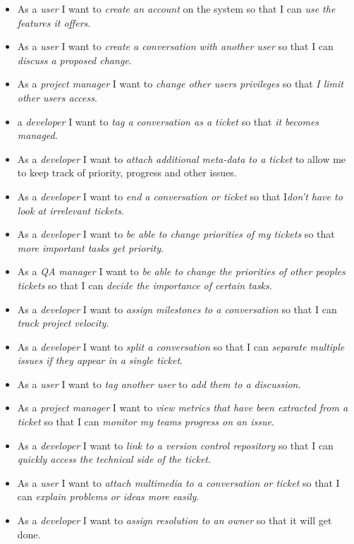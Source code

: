 \documentclass[a4paper]{l3proj}
\begin{document}
\begin{itemize}
\item As a \textit{user} I want to \textit{create an account} on the system so that I can \textit{use the features it offers}.
\item As a \textit{user} I want to \textit{create a conversation with another user} so that I can \textit{discuss a proposed change}.
\item As a \textit{project manager} I want to \textit{change other users privileges} so that \textit{I limit other users access}.
\item  a \textit{developer} I want to \textit{tag a conversation as a ticket} so that \textit{it becomes managed}.
\item As a \textit{developer} I want to \textit{attach additional meta-data to a ticket} to allow me to keep track of priority, progress and other issues.
\item As a \textit{developer} I want to \textit{end a conversation or ticket} so that I\textit{don't have to look at irrelevant tickets}.
\item As a \textit{developer} I want to \textit{be able to change priorities of my tickets} so that \textit{more important tasks get priority}.
\item As a \textit{QA manager} I want to \textit{be able to change the priorities of other peoples tickets} so that I can \textit{decide the importance of certain tasks}.
\item As a \textit{developer} I want to \textit{assign milestones to a conversation} so that I can \textit{track project velocity}.
\item As a \textit{developer} I want to \textit{split a conversation} so that I can \textit{separate multiple issues if they appear in a single ticket}.
\item As a \textit{user} I want to \textit{tag another user} to \textit{add them to a discussion}.
\item As a \textit{project manager} I want to \textit{view metrics that have been extracted from a ticket} so that I can \textit{monitor my teams progress on an issue}.
\item As a \textit{developer} I want to \textit{link to a version control repository} so that I can \textit{quickly access the technical side of the ticket}.
\item As a \textit{user} I want to \textit{attach multimedia to a conversation or ticket} so that I can \textit{explain problems or ideas more easily}.
\item As a \textit{developer} I want to \textit{assign resolution to an owner} so that it will get done.

\end{itemize}
\end{document}
